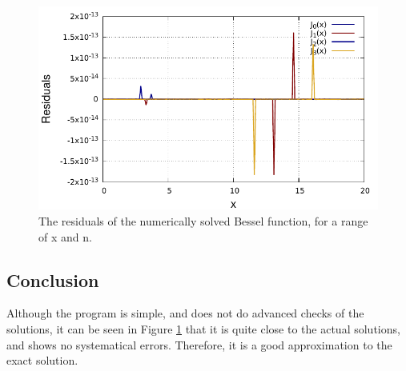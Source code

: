 \documentclass[twocolumn]{article}
\begin{document}
\begin{figure}[t]
	\centering
	\includegraphics[width=\linewidth]{fig2.pdf}
	\caption{The residuals of the numerically solved Bessel function, for a range of x and n.}
	\label{fig:2}
\end{figure}

\subsection*{Conclusion}

Although the program is simple, and does not do advanced checks of the solutions, it can be seen in Figure \ref{fig:2} that it is quite close to the actual solutions, and shows no systematical errors. Therefore, it is a good approximation to the exact solution.

\printbibliography
\end{document}
